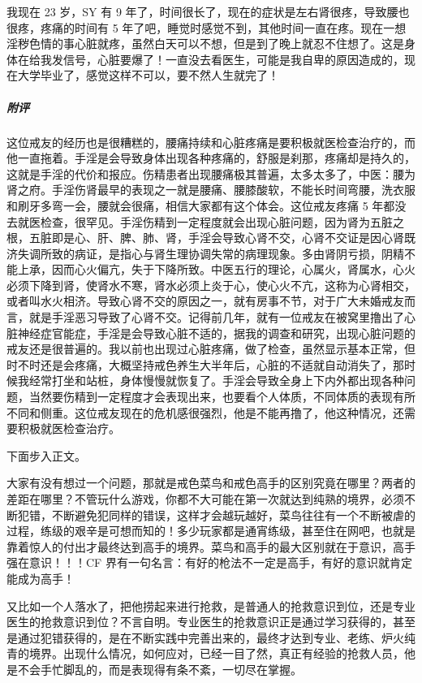\begin{case}
    我现在 23 岁，SY 有 9 年了，时间很长了，现在的症状是左右肾很疼，导致腰也很疼，疼痛的时间有 5 年了吧，睡觉时感觉不到，其他时间一直在疼。现在一想淫秽色情的事心脏就疼，虽然白天可以不想，但是到了晚上就忍不住想了。这是身体在给我发信号，心脏要爆了！一直没去看医生，可能是我自卑的原因造成的，现在大学毕业了，感觉这样不可以，要不然人生就完了！
    \subparagraph{附评} 这位戒友的经历也是很糟糕的，腰痛持续和心脏疼痛是要积极就医检查治疗的，而他一直拖着。手淫是会导致身体出现各种疼痛的，舒服是刹那，疼痛却是持久的，这就是手淫的代价和报应。伤精患者出现腰痛极其普遍，太多太多了，中医：腰为肾之府。手淫伤肾最早的表现之一就是腰痛、腰膝酸软，不能长时间弯腰，洗衣服和刷牙多弯一会，腰就会很痛，相信大家都有这个体会。这位戒友疼痛 5 年都没去就医检查，很罕见。手淫伤精到一定程度就会出现心脏问题，因为肾为五脏之根，五脏即是心、肝、脾、肺、肾，手淫会导致心肾不交，心肾不交证是因心肾既济失调所致的病证，是指心与肾生理协调失常的病理现象。多由肾阴亏损，阴精不能上承，因而心火偏亢，失于下降所致。中医五行的理论，心属火，肾属水，心火必须下降到肾，使肾水不寒，肾水必须上炎于心，使心火不亢，这称为心肾相交，或者叫水火相济。导致心肾不交的原因之一，就有房事不节，对于广大未婚戒友而言，就是手淫恶习导致了心肾不交。记得前几年，就有一位戒友在被窝里撸出了心脏神经症官能症，手淫是会导致心脏不适的，据我的调查和研究，出现心脏问题的戒友还是很普遍的。我以前也出现过心脏疼痛，做了检查，虽然显示基本正常，但时不时还是会疼痛，大概坚持戒色养生大半年后，心脏的不适就自动消失了，那时候我经常打坐和站桩，身体慢慢就恢复了。手淫会导致全身上下内外都出现各种问题，当然要伤精到一定程度才会表现出来，也要看个人体质，不同体质的表现有所不同和侧重。这位戒友现在的危机感很强烈，他是不能再撸了，他这种情况，还需要积极就医检查治疗。
\end{case}

下面步入正文。

大家有没有想过一个问题，那就是戒色菜鸟和戒色高手的区别究竟在哪里？两者的差距在哪里？不管玩什么游戏，你都不大可能在第一次就达到纯熟的境界，必须不断犯错，不断避免犯同样的错误，这样才会越玩越好，菜鸟往往有一个不断被虐的过程，练级的艰辛是可想而知的！多少玩家都是通宵练级，甚至住在网吧，也就是靠着惊人的付出才最终达到高手的境界。菜鸟和高手的最大区别就在于意识，高手强在意识！！！CF 界有一句名言：有好的枪法不一定是高手，有好的意识就肯定能成为高手！

又比如一个人落水了，把他捞起来进行抢救，是普通人的抢救意识到位，还是专业医生的抢救意识到位？不言自明。专业医生的抢救意识正是通过学习获得的，甚至是通过犯错获得的，是在不断实践中完善出来的，最终才达到专业、老练、炉火纯青的境界。出现什么情况，如何应对，已经一目了然，真正有经验的抢救人员，他是不会手忙脚乱的，而是表现得有条不紊，一切尽在掌握。

